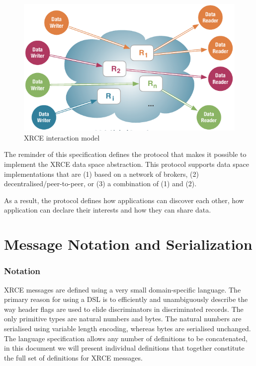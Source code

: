 \documentclass[a4paper,oneside,article]{memoir}
\begin{document}
\begin{figure}
  \centering
  \includegraphics[scale=0.8]{xrce-interaction-model.pdf}
  \caption{XRCE interaction model}\label{fig:interaction-model}
\end{figure}

The reminder of this specification defines the protocol that makes it possible to implement the XRCE
data space abstraction.  This protocol supports data space implementations that are (1) based on a
network of brokers, (2) decentralised/peer-to-peer, or (3) a combination of (1) and (2).

As a result, the protocol defines how applications can discover each other, how application can
declare their interests and how they can share data.

\chapter{Message Notation and Serialization}

\subsection{Notation}

XRCE messages are defined using a very small domain-specific language.  The primary reason for using
a DSL is to efficiently and unambiguously describe the way header flags are used to elide
discriminators in discriminated records.  The only primitive types are natural numbers and
bytes. The natural numbers are serialised using variable length encoding, whereas bytes are
serialised unchanged.  The language specification allows any number of definitions to be
concatenated, in this document we will present individual definitions that together constitute the
full set of definitions for XRCE messages.
\end{document}
